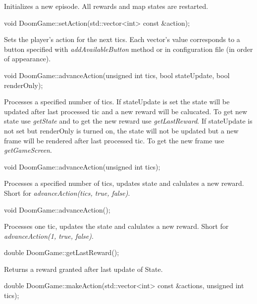 	Initializes a new episode. All rewards and map states are restarted.


\vspace{20pt}
\begin{clinee}
	void DoomGame::setAction(std::vector<int> const &action);
\end{clinee}

	Sets the player's action for the next tics.
	Each vector's value corresponds to a button specified with \emph{addAvailableButton} method or in configuration file (in order of appearance).


\vspace{20pt}
\begin{clinee}
	void DoomGame::advanceAction(unsigned int tics, bool stateUpdate, 
						bool renderOnly);
\end{clinee}

    	Processes a specified number of tics. If stateUpdate is set the state will be updated after last processed tic and a new reward will be calucated. To get new state use \emph{getState} and to get the new reward use  \emph{getLastReward}. If stateUpdate is not set but renderOnly is turned on, the state will not be updated but a new frame will be rendered after last processed tic. To get the new frame use \emph{getGameScreen}.

\vspace{20pt}
\begin{clinee}
	void DoomGame::advanceAction(unsigned int tics);
\end{clinee}

    	Processes a specified number of tics, updates state and calulates a new reward. Short for \emph{advanceAction(tics, true, false)}.


\vspace{20pt}
\begin{clinee}
	void DoomGame::advanceAction();
\end{clinee}

	Processes one tic, updates the state and calulates a new reward. Short for \emph{advanceAction(1, true, false)}.


\vspace{20pt}
\begin{clinee}
	double DoomGame::getLastReward();
\end{clinee}

	Returns a reward granted after last update of State. 


\vspace{20pt}
\begin{clinee}
	double DoomGame::makeAction(std::vector<int> const &actions,
					 unsigned int tics);
\end{clinee}

